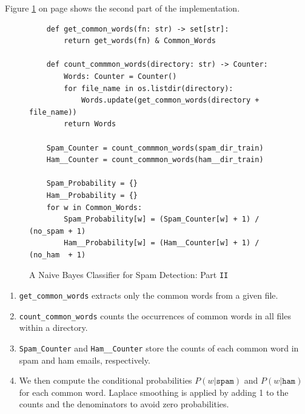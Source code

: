 Figure \ref{fig:Spam-Detection.ipynb-2} on page \pageref{fig:Spam-Detection.ipynb-2} shows the second part of the implementation.

\begin{figure}[!ht]
\centering
\begin{verbatim}
    def get_common_words(fn: str) -> set[str]:
        return get_words(fn) & Common_Words
    
    def count_commmon_words(directory: str) -> Counter:
        Words: Counter = Counter()
        for file_name in os.listdir(directory):
            Words.update(get_common_words(directory + file_name))
        return Words
    
    Spam_Counter = count_commmon_words(spam_dir_train)
    Ham__Counter = count_commmon_words(ham__dir_train)
    
    Spam_Probability = {}
    Ham__Probability = {}
    for w in Common_Words:
        Spam_Probability[w] = (Spam_Counter[w] + 1) / (no_spam + 1)
        Ham__Probability[w] = (Ham__Counter[w] + 1) / (no_ham  + 1)
\end{verbatim}
\caption{A Naive Bayes Classifier for Spam Detection: Part \texttt{II}}
\label{fig:Spam-Detection.ipynb-2}
\end{figure}

\begin{enumerate}
\item \texttt{get\_common\_words} extracts only the common words from a given file.
\item \texttt{count\_common\_words} counts the occurrences of common words in all files within a directory.
\item \texttt{Spam\_Counter} and \texttt{Ham\_\_Counter} store the counts of each common word in spam and ham emails, respectively.
\item We then compute the conditional probabilities $P(w | \texttt{spam})$ and $P(w | \texttt{ham})$ for each common word. Laplace smoothing is applied by adding 1 to the counts and the denominators to avoid zero probabilities.
\end{enumerate}

